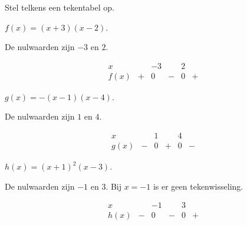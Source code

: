 \documentclass{ximera}
\begin{document}
\begin{oefening}{\oefB\ESS}

Stel telkens een tekentabel op.

\begin{question}
\(
f(x)=(x+3)(x-2).
\)

\begin{oplossing}
De nulwaarden zijn \(-3\) en \(2\).

\[
\begin{array}{c|ccccc}
x &  & -3 &  & 2 & \\
\hline
f(x)&+&0&-&0&+
\end{array}
\]
\end{oplossing}
\end{question}

\begin{question}
\(
g(x)=-(x-1)(x-4).
\)

\begin{oplossing}
De nulwaarden zijn \(1\) en \(4\).

\[
\begin{array}{c|ccccc}
x &  & 1 &  & 4 & \\
\hline
g(x)&-&0&+&0&-
\end{array}
\]
\end{oplossing}
\end{question}

\begin{question}
\(
h(x)=(x+1)^2(x-3).
\)

\begin{oplossing}
De nulwaarden zijn \(-1\) en \(3\).
Bij \(x=-1\) is er geen tekenwisseling.

\[
\begin{array}{c|ccccc}
x &  & -1 &  & 3 & \\
\hline
h(x)&-&0&-&0&+
\end{array}
\]
\end{oplossing}
\end{question}

\end{oefening}
\end{document}
